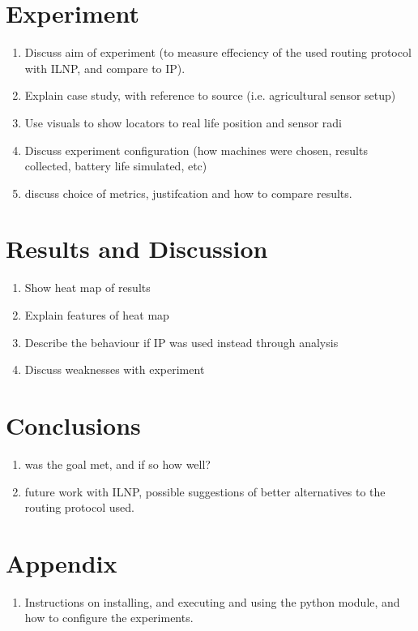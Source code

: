 \documentclass[12pt]{article}
\begin{document}
\section{Experiment}

\begin{enumerate}
\item Discuss aim of experiment (to measure effeciency of the used routing protocol with ILNP, and compare to IP).
\item Explain case study, with reference to source (i.e. agricultural sensor setup)
\item Use visuals to show locators to real life position and sensor radi
\item Discuss experiment configuration (how machines were chosen, results collected, battery life simulated, etc)
\item discuss choice of metrics, justifcation and how to compare results.
\end{enumerate}

\section{Results and Discussion}

\begin{enumerate}
\item Show heat map of results
\item Explain features of heat map
\item Describe the behaviour if IP was used instead through analysis
\item Discuss weaknesses with experiment
\end{enumerate}

\section{Conclusions}

\begin{enumerate}	
\item was the goal met, and if so how well?
\item future work with ILNP, possible suggestions of better alternatives to the routing protocol used.
\end{enumerate}

\section{Appendix}
\begin{enumerate}
\item Instructions on installing, and executing and using the python module, and how to configure the experiments.
\end{enumerate}



\end{document}
